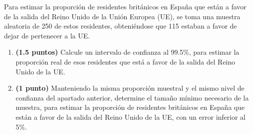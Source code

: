 
Para estimar la proporción de residentes británicos en España que están
a favor de la salida del Reino Unido de la Unión Europea (UE), se toma una
muestra aleatoria de 250 de estos residentes, obteniéndose que 115 estaban
a favor de dejar de pertenecer a la UE.
\begin{enumerate}[label=\alph*)]
  \item \textbf{(1.5 puntos)} Calcule un intervalo de confianza al 99.5\%,
  para estimar la proporción real de esos residentes que está a favor de la
  salida del Reino Unido de la UE.
  \item \textbf{(1 punto)} Manteniendo la misma proporción muestral y el
  mismo nivel de confianza del apartado anterior, determine el tamaño mínimo
  necesario de la muestra, para estimar la proporción de residentes británicos
  en España que están a favor de la salida del Reino Unido de la UE, con un
  error inferior al 5\%.
\end{enumerate}
